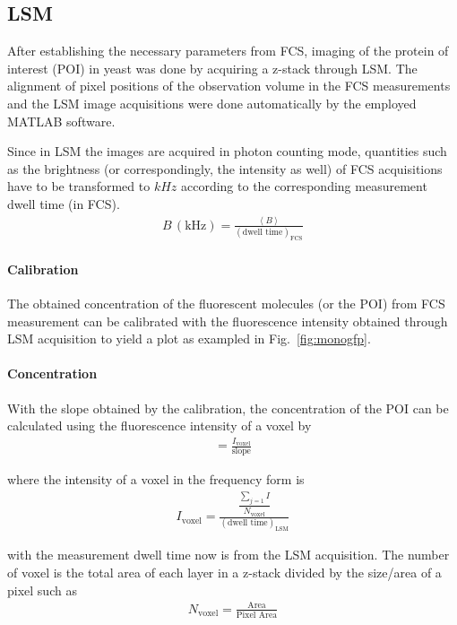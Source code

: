 \subsection{LSM}

After establishing the necessary parameters from FCS, imaging of the protein of interest (POI) in yeast was done by acquiring a z-stack through LSM. 
The alignment of pixel positions of the observation volume in the FCS measurements and the LSM image acquisitions were done automatically by the employed MATLAB software. 

Since in LSM the images are acquired in photon counting mode, quantities such as the brightness (or correspondingly, the intensity as well) of FCS acquisitions have to be transformed to $kHz$ according to the corresponding measurement dwell time (in FCS).
\begin{align} 
B\,(\text{kHz}) = \frac{\left\langle B\right\rangle }{(\text{dwell time})_{\text{FCS}}}
\end{align}

\paragraph{Calibration} 
The obtained concentration of the fluorescent molecules (or the POI) from FCS measurement can be calibrated with the fluorescence intensity obtained through LSM acquisition to yield a plot as exampled in Fig.~\ref{fig:monogfp}.  

\paragraph{Concentration}
With the slope obtained by the calibration, the concentration of the POI can be calculated using the fluorescence intensity of a voxel by
\begin{align} 
[C] = \frac{I_{\text{voxel}}}{\text{slope}}
\end{align}

where the intensity of a voxel in the frequency form is
\begin{align} 
I_{\text{voxel}} = \frac{\dfrac{\sum_{j=1}^{} I}{N_{\text{voxel}}}}{(\text{dwell time})_{\text{LSM}}} 
\end{align}

with the measurement dwell time now is from the LSM acquisition. The number of voxel is the total area of each layer in a z-stack divided by the size/area of a pixel such as
\begin{align} 
N_{\text{voxel}} = \frac{\text{Area}}{\text{Pixel Area}}
\end{align}

